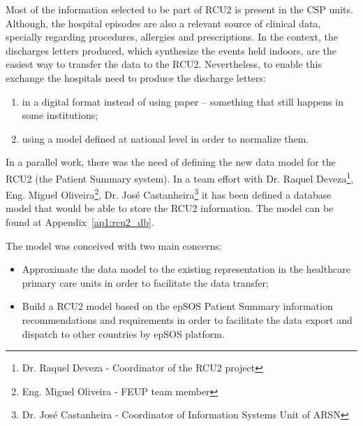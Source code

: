 Most of the information selected to be part of RCU2 is present in the CSP units. Although, the hospital episodes are also a relevant source of clinical data, specially regarding procedures, allergies and prescriptions. In the context, the discharges letters produced, which synthesize the events held indoors, are the easiest way to transfer the data to the RCU2. Nevertheless, to enable this exchange the hospitals need to produce the discharge letters:
\begin{enumerate}
\item in a digital format instead of using paper -- something that still happens in some institutions;
\item using a model defined at national level in order to normalize them.
\end{enumerate}







In a parallel work, there was the need of defining the new data model for the RCU2 (the Patient Summary system). In a team effort with Dr. Raquel Deveza\footnote{Dr. Raquel Deveza - Coordinator of the RCU2 project}, Eng. Miguel Oliveira\footnote{Eng. Miguel Oliveira - FEUP team member}, Dr. José Castanheira\footnote{Dr. José Castanheira - Coordinator of Information Systems Unit of ARSN} it has been defined a database model that would be able to store the RCU2 information. The model can be found at Appendix~\ref{ap1:rcu2_db}.

The model was conceived with two main concerns:
\begin{itemize}
\item Approximate the data model to the existing representation in the healthcare primary care units in order to facilitate the data transfer;
\item Build a RCU2 model based on the epSOS Patient Summary information recommendations and requirements in order to facilitate the data export and dispatch to other countries by epSOS platform.
\end{itemize}

